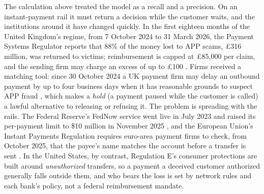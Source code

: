 \documentclass[../ai_in_finance]{subfiles}
\begin{document}
The calculation above treated the model as a recall and a precision. On an instant-payment rail it must return a decision while the customer waits, and the institutions around it have changed quickly. In the first eighteen months of the United Kingdom's regime, from 7 October 2024 to 31 March 2026, the Payment Systems Regulator reports that 88\% of the money lost to APP scams, \pounds316 million, was returned to victims; reimbursement is capped at \pounds85,000 per claim, and the sending firm may charge an excess of up to \pounds100 \parencite{psr2026dashboard}. Firms received a matching tool: since 30 October 2024 a UK payment firm may delay an outbound payment by up to four business days when it has reasonable grounds to suspect APP fraud \parencite{fca2024fg246}, which makes a \emph{hold} (a payment paused while the customer is called) a lawful alternative to releasing or refusing it. The problem is spreading with the rails. The Federal Reserve's FedNow service went live in July 2023 and raised its per-payment limit to \$10 million in November 2025 \parencite{frb2025fednow}, and the European Union's Instant Payments Regulation requires euro-area payment firms to check, from October 2025, that the payee's name matches the account before a transfer is sent \parencite{eu2024ipr}. In the United States, by contrast, Regulation E's consumer protections are built around \emph{unauthorized} transfers, so a payment a deceived customer authorized generally falls outside them, and who bears the loss is set by network rules and each bank's policy, not a federal reimbursement mandate.
\end{document}
